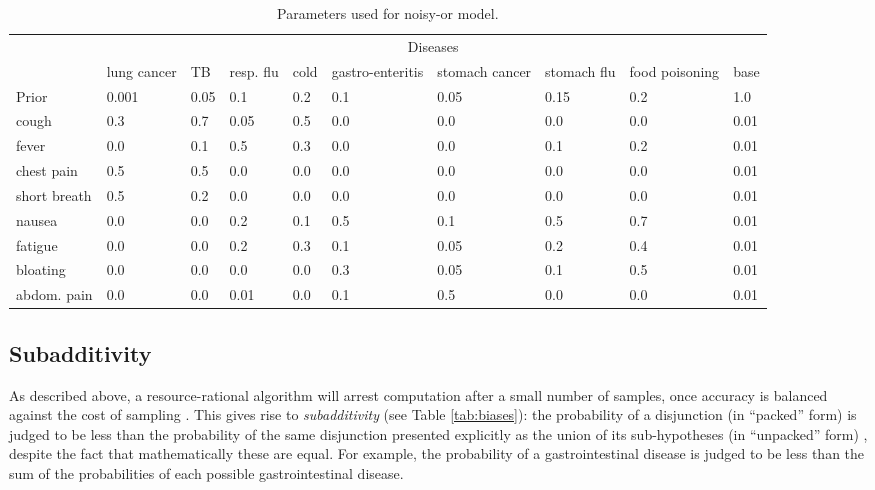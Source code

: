 \begin{table}[htbp]
\caption{Parameters used for noisy-or model.}
  \begin{center}
\begin{tabular}{>{\raggedright}m{} m{} m{} m{} m{} m{} m{} m{} m{} m{}} 
  \toprule

     \multirow{2}{*}{Symptoms} &
      \multicolumn{9}{c}{Diseases} \\
 & lung cancer & TB & resp. flu & cold & gastro-enteritis & stomach cancer & stomach flu & food poisoning & base \\
\midrule
Prior & 0.001 & 0.05 & 0.1 & 0.2 & 0.1 & 0.05 & 0.15 & 0.2 & 1.0\\
cough & 0.3 & 0.7 & 0.05 & 0.5 & 0.0 & 0.0 & 0.0 & 0.0 & 0.01 \\
fever & 0.0 & 0.1 & 0.5 & 0.3 & 0.0 & 0.0 & 0.1 & 0.2 & 0.01 \\
chest pain & 0.5 & 0.5 & 0.0 & 0.0 & 0.0 & 0.0 & 0.0 & 0.0 & 0.01 \\
short breath & 0.5 & 0.2 & 0.0 & 0.0 & 0.0 & 0.0 & 0.0 & 0.0 & 0.01 \\
nausea & 0.0 & 0.0 & 0.2 & 0.1 & 0.5 & 0.1 & 0.5 & 0.7 & 0.01 \\ 
fatigue & 0.0 & 0.0 & 0.2 & 0.3 & 0.1 & 0.05 & 0.2 & 0.4 & 0.01 \\
bloating & 0.0 & 0.0 & 0.0 & 0.0 & 0.3 & 0.05 & 0.1 & 0.5 & 0.01 \\
abdom. pain & 0.0 & 0.0 & 0.01 & 0.0 & 0.1 & 0.5 & 0.0 & 0.0 & 0.01 \\
\bottomrule
\end{tabular}
\end{center}
\label{tab:qmr}

\end{table}

\subsection{Subadditivity}

As described above, a resource-rational algorithm will arrest computation after a small number of samples, once accuracy is balanced against the cost of sampling \citep{Vul2014}. This gives rise to \emph{subadditivity} (see Table \ref{tab:biases}): the probability of a disjunction (in ``packed'' form) is judged to be less than the probability of the same disjunction presented explicitly as the union of its sub-hypotheses (in ``unpacked'' form) \citep{tversky94,Dougherty2003}, despite the fact that mathematically these are equal. For example, the probability of a gastrointestinal disease is judged to be less than the sum of the probabilities of each possible gastrointestinal disease.

